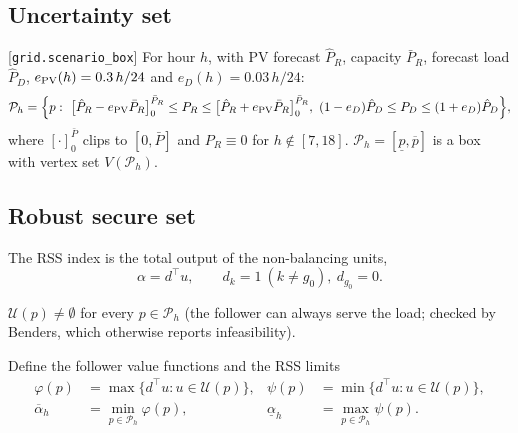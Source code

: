 \subsection{Uncertainty set}
[\texttt{grid.scenario\_box}] For hour $h$, with PV forecast $\hat P_{R}$, capacity
$\bar P_R$, forecast load $\hat P_D$, $e_{\rm PV}(h)=0.3\,h/24$ and $e_D(h)=0.03\,h/24$:
\begin{equation}
\mathcal P_h=\Big\{p:\ \big[\hat P_R-e_{\rm PV}\bar P_R\big]_0^{\bar P_R}\le P_R\le\big[\hat P_R+e_{\rm PV}\bar P_R\big]_0^{\bar P_R},\
(1-e_D)\hat P_D\le P_D\le(1+e_D)\hat P_D\Big\},
\label{eq:box}
\end{equation}
where $[\cdot]_0^{\bar P}$ clips to $[0,\bar P]$ and $P_R\equiv0$ for $h\notin[7,18]$.
$\mathcal P_h=[\underline p,\overline p]$ is a box with vertex set $V(\mathcal P_h)$.

\subsection{Robust secure set}
The RSS index is the total output of the non-balancing units,
\begin{equation}
\alpha=d^\top u,\qquad d_k=1\ (k\neq g_0),\ d_{g_0}=0 .
\label{eq:index}
\end{equation}
\begin{assumption}\label{as:feas}
$\mathcal U(p)\neq\emptyset$ for every $p\in\mathcal P_h$ (the follower can always serve the
load; checked by Benders, which otherwise reports infeasibility).
\end{assumption}
Define the follower value functions and the RSS limits
\begin{align}
\varphi(p)&=\max\{d^\top u:u\in\mathcal U(p)\}, & \psi(p)&=\min\{d^\top u:u\in\mathcal U(p)\},\label{eq:vf}\\
\overline\alpha_h&=\min_{p\in\mathcal P_h}\varphi(p), & \underline\alpha_h&=\max_{p\in\mathcal P_h}\psi(p). \label{eq:rssdef}
\end{align}


